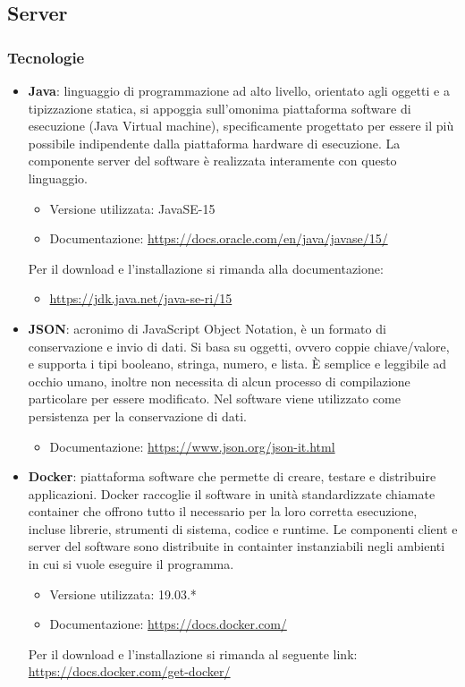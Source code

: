\subsection{Server}

\subsubsection{Tecnologie}
\label{tecnologie}

\begin{itemize}
	\item \textbf{Java}: linguaggio di programmazione ad alto livello, orientato agli oggetti e a tipizzazione statica, si appoggia sull'omonima piattaforma software di esecuzione (Java Virtual machine), specificamente progettato per essere il più possibile indipendente dalla piattaforma hardware di esecuzione. La componente server del software è realizzata interamente con questo linguaggio.
	\begin{itemize}
		\item Versione utilizzata: JavaSE-15
		\item Documentazione: \url{https://docs.oracle.com/en/java/javase/15/}
	\end{itemize}
	Per il download e l'installazione si rimanda alla documentazione:
	\begin{itemize}
		\item \url{https://jdk.java.net/java-se-ri/15}
	\end{itemize}

	\item \textbf{JSON}: acronimo di JavaScript Object Notation, è un formato di conservazione e invio di dati. Si basa su oggetti, ovvero coppie chiave/valore, e supporta i tipi booleano, stringa, numero, e lista. È semplice e leggibile ad occhio umano, inoltre non necessita di alcun processo di
	compilazione particolare per essere modificato. Nel software viene utilizzato come persistenza per la conservazione di dati.
	\begin{itemize}
		\item Documentazione: \url{https://www.json.org/json-it.html}
	\end{itemize}

	\item \textbf{Docker}: piattaforma software che permette di creare, testare e distribuire applicazioni. Docker raccoglie il software in unità standardizzate chiamate container che offrono tutto il necessario per la loro corretta esecuzione, incluse librerie, strumenti di sistema, codice e runtime. Le componenti client e server del software sono distribuite in containter instanziabili negli ambienti in cui si vuole eseguire il programma.
	\begin{itemize}
		\item Versione utilizzata: 19.03.*
		\item Documentazione: \url{https://docs.docker.com/}
	\end{itemize}
	Per il download e l'installazione si rimanda al seguente link: \url{https://docs.docker.com/get-docker/}


\end{itemize}
